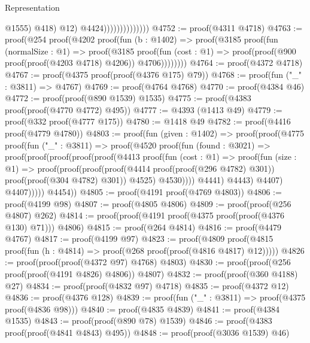 \begin{lexlean}{Representation}
\begin{coremodule}
                                                      @1555)
                                                    @418)
                                                  @12)
                                                @4424))))))))))))))
@4752 := proof(@4311 @4718)
@4763 := proof(@254
      proof(@4202
          proof(fun (b : @1402) =>
            proof(@3185
                proof(fun (normalSize : @1) =>
                  proof(@3185
                      proof(fun (cost : @1) =>
                        proof(proof(@900 proof(proof(@4203 @4718) @4206)) @4706))))))))
@4764 := proof(@4372 @4718)
@4767 := proof(@4375 proof(proof(@4376 @175) @79))
@4768 := proof(fun ("_" : @3811) => @4767)
@4769 := proof(@4764 @4768)
@4770 := proof(@4384 @46)
@4772 := proof(proof(@890 @1539) @1535)
@4775 := proof(@4383 proof(proof(@4770 @4772) @495))
@4777 := @4393 (@1413 @49)
@4779 := proof(@332 proof(@4777 @175))
@4780 := @1418 @49
@4782 := proof(@4416 proof(@4779 @4780))
@4803 := proof(fun (given : @1402) =>
    proof(proof(@4775
          proof(fun ("_" : @3811) =>
            proof(@4520
                proof(fun (found : @3021) =>
                  proof(proof(proof(proof(proof(@4413
                              proof(fun (cost : @1) =>
                                proof(fun (size : @1) =>
                                  proof(proof(proof(proof(@4414 proof(proof(@296 @4782) @301))
                                          proof(proof(@304 @4782) @301))
                                        @4525)
                                      @4530))))
                            @4441)
                          @4443)
                        @4407)
                      @4407)))))
        @4454))
@4805 := proof(@4191 proof(@4769 @4803))
@4806 := proof(@4199 @98)
@4807 := proof(@4805 @4806)
@4809 := proof(proof(@256 @4807) @262)
@4814 := proof(proof(@4191 proof(@4375 proof(proof(@4376 @130) @71))) @4806)
@4815 := proof(@264 @4814)
@4816 := proof(@4479 @4767)
@4817 := proof(@4199 @97)
@4823 := proof(@4809
      proof(@4815 proof(fun (h : @4814) => proof(@268 proof(proof(@4816 @4817) @12)))))
@4826 := proof(proof(proof(@4372 @97) @4768) @4803)
@4830 := proof(proof(@256 proof(proof(@4191 @4826) @4806)) @4807)
@4832 := proof(proof(@360 @4188) @27)
@4834 := proof(proof(@4832 @97) @4718)
@4835 := proof(@4372 @12)
@4836 := proof(@4376 @128)
@4839 := proof(fun ("_" : @3811) => proof(@4375 proof(@4836 @98)))
@4840 := proof(@4835 @4839)
@4841 := proof(@4384 @1535)
@4843 := proof(proof(@890 @78) @1539)
@4846 := proof(@4383 proof(proof(@4841 @4843) @495))
@4848 := proof(proof(@3036 @1539) @46)

\end{coremodule}
\end{lexlean}
